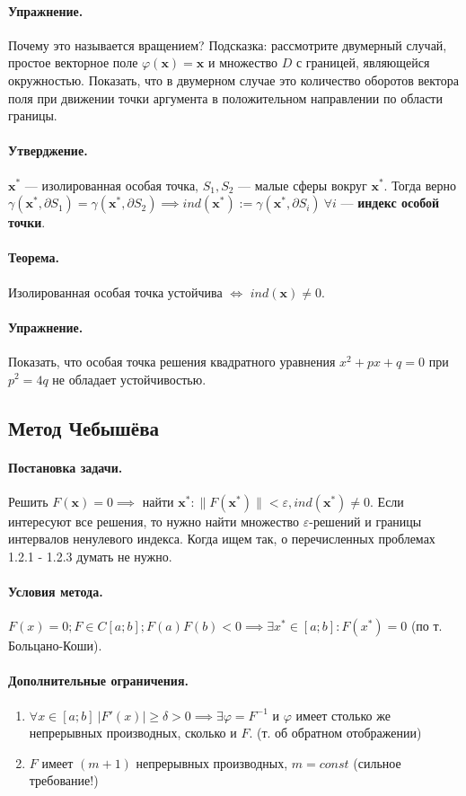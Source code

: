 \paragraph{Упражнение.} Почему это называется вращением? Подсказка: рассмотрите двумерный случай, простое векторное поле $\varphi(\mathbf{x}) = \mathbf{x}$ и множество $D$ с границей, являющейся окружностью. Показать, что в двумерном случае это количество оборотов вектора поля при движении точки аргумента в положительном направлении по области границы.
\paragraph{Утверджение.} $\mathbf{x}^*$ --- изолированная особая точка, $S_1, S_2$ --- малые сферы вокруг $\mathbf{x}^*$. Тогда верно $\gamma(\mathbf{x}^*, \partial S_1) = \gamma(\mathbf{x}^*, \partial S_2) \implies ind(\mathbf{x}^*) := \gamma(\mathbf{x}^*, \partial S_i) \ \forall i$ --- \textbf{индекс особой точки}.
\paragraph{Теорема.} Изолированная особая точка устойчива $\iff$ $ind(\mathbf{x}) \neq 0$.
\paragraph{Упражнение.} Показать, что особая точка решения квадратного уравнения $x^2+px+q=0$ при $p^2=4q$ не обладает устойчивостью.
\subsection{Метод Чебышёва}
\paragraph{Постановка задачи.}
Решить $F(\mathbf{x}) = 0 \implies$ найти $\mathbf{x}^*: \|F(\mathbf{x}^*)\|<\varepsilon, ind(\mathbf{x}^*) \neq 0$.
Если интересуют все решения, то нужно найти множество $\varepsilon$-решений и границы интервалов ненулевого индекса.
Когда ищем так, о перечисленных проблемах 1.2.1 - 1.2.3 думать не нужно.
\paragraph{Условия метода.}
$F(x)=0; F \in C[a; b]; F(a)F(b) < 0 \implies \exists x^* \in [a; b]: F(x^*)=0$ (по т. Больцано-Коши).

\paragraph{Дополнительные ограничения.}
\begin{enumerate}
	\item $\forall x \in [a; b]\ \left| F'(x) \right| \ge \delta > 0 \implies \exists \varphi = F^{-1}$ и $\varphi$ имеет столько же непрерывных производных, сколько и $F$. (т. об обратном отображении)
	\item $F$ имеет $(m+1)$ непрерывных производных, $m = const$ (сильное требование!)
\end{enumerate}

